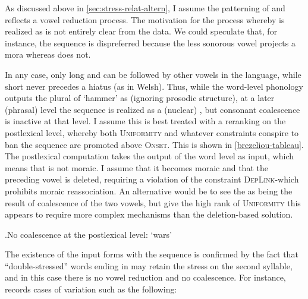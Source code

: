 As discussed above in \cref{sec:stress-relat-altern}, I assume the patterning of \ipa{[ɛ]} and \ipa{[ə]} reflects a vowel reduction process. The motivation for the process whereby \ipa{[əi]} is realized as \ipa{[i]} is not entirely clear from the data. We could speculate that, for instance, the sequence \ipa{[ə.jV]} is dispreferred because the less sonorous vowel \ipa{[ə]} projects a mora whereas \ipa{[i]} does not.

In any case, only long \ipa{[øː]} and \ipa{[ø̃ː]} can be followed by other vowels in the language, while short \ipa{[ə]} never precedes a hiatus (as in Welsh). Thus, while the word-level phonology outputs the plural of `hammer' as \ipa{[mɒrzəiəw]} (ignoring prosodic structure), at a later (phrasal) level the \ipa{[əi]} sequence is realized as a (nuclear) \ipa{[i]}, but consonant\endash\ipa{[i]} coalescence is inactive at that level. I assume this is best treated with a reranking on the postlexical level, whereby both \textsc{Uniformity} and whatever constraints conspire to ban the \ipa{[əi]} sequence are promoted above \textsc{Onset}. This is shown in \ref{brezeliou-tableau}. The postlexical computation takes the output of the word level as input, which means that \ipa{[i]} is not moraic. I assume that it becomes moraic and that the preceding vowel is deleted, requiring a violation of the constraint \textsc{DepLink}-\mo which prohibits moraic reassociation. An alternative would be to see the \ipa{[i]} as being the result of coalescence of the two vowels, but give the high rank of \textsc{Uniformity} this appears to require more complex mechanisms than the deletion\hyp based solution.

\ex.\label{brezeliou-tableau}No coalescence at the postlexical level: \ipa{[ˈbrøziəw]} `wars'\\

The existence of the input forms with the \ipa{[Vj]} sequence is confirmed by the fact that \enquote{double\hyp stressed} words ending in \ipa{[l]} may retain the stress on the second syllable, and in this case there is no vowel reduction and no coalescence. For instance, \citet{humphreys95:_phonol_bothoa_saint_nicol_pelem} records cases of variation such as the following:

